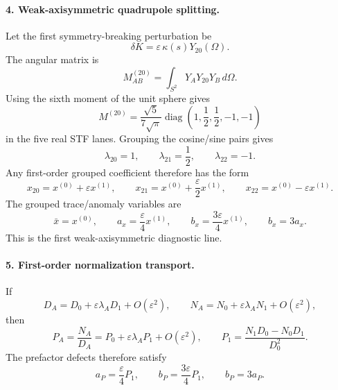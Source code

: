 \paragraph{4. Weak-axisymmetric quadrupole splitting.}
Let the first symmetry-breaking perturbation be
\begin{equation}
\label{eq:app-stage024-deltaK-axisym}
\delta K=\varepsilon\,\kappa(s)Y_{20}(\Omega).
\end{equation}
The angular matrix is
\begin{equation}
\label{eq:app-stage024-MAB20}
M_{AB}^{(20)}=\int_{S^2}Y_A Y_{20}Y_B\,d\Omega.
\end{equation}
Using the sixth moment of the unit sphere gives
\begin{equation}
\label{eq:app-stage024-axisym-matrix}
\boxed{
M^{(20)}=\frac{\sqrt5}{7\sqrt\pi}\operatorname{diag}\left(1,\frac12,\frac12,-1,-1\right)
}
\end{equation}
in the five real STF lanes.  Grouping the cosine/sine pairs gives
\begin{equation}
\label{eq:app-stage024-lambda-signature}
\boxed{
\lambda_{20}=1,
\qquad
\lambda_{21}=\frac12,
\qquad
\lambda_{22}=-1}.
\end{equation}
Any first-order grouped coefficient therefore has the form
\begin{equation}
\label{eq:app-stage024-x-signature}
x_{20}=x^{(0)}+\varepsilon x^{(1)},
\qquad
x_{21}=x^{(0)}+\frac{\varepsilon}{2}x^{(1)},
\qquad
x_{22}=x^{(0)}-\varepsilon x^{(1)}.
\end{equation}
The grouped trace/anomaly variables are
\begin{equation}
\label{eq:app-stage024-b-3a}
\boxed{
\bar x=x^{(0)},
\qquad
a_x=\frac{\varepsilon}{4}x^{(1)},
\qquad
b_x=\frac{3\varepsilon}{4}x^{(1)},
\qquad
b_x=3a_x}.
\end{equation}
This is the first weak-axisymmetric diagnostic line.

\paragraph{5. First-order normalization transport.}
If
\begin{equation}
D_A=D_0+\varepsilon\lambda_A D_1+O(\varepsilon^2),
\qquad
N_A=N_0+\varepsilon\lambda_A N_1+O(\varepsilon^2),
\end{equation}
then
\begin{equation}
\label{eq:app-stage024-PA-transport}
P_A=\frac{N_A}{D_A}=P_0+\varepsilon\lambda_A P_1+O(\varepsilon^2),
\qquad
\boxed{P_1=\frac{N_1D_0-N_0D_1}{D_0^2}}.
\end{equation}
The prefactor defects therefore satisfy
\begin{equation}
\label{eq:app-stage024-P-defects}
\boxed{
a_P=\frac{\varepsilon}{4}P_1,
\qquad
b_P=\frac{3\varepsilon}{4}P_1,
\qquad
b_P=3a_P}.
\end{equation}

